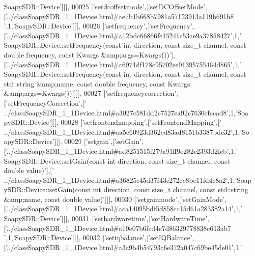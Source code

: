 \begin{DoxyCode}
{      SoapySDR::Device'}]]],
00025   [\textcolor{stringliteral}{'setdcoffsetmode'},[\textcolor{stringliteral}{'setDCOffsetMode'},[\textcolor{stringliteral}{'../classSoapySDR\_1\_1Device.html#ae7b1b668b7981a57123913a119b691b8
      '},1,\textcolor{stringliteral}{'SoapySDR::Device'}]]],
00026   [\textcolor{stringliteral}{'setfrequency'},[\textcolor{stringliteral}{'setFrequency'},[\textcolor{stringliteral}{'../classSoapySDR\_1\_1Device.html#a12bdc66866fe15241c53ae9a37858427'},1,\textcolor{stringliteral}{'
      SoapySDR::Device::setFrequency(const int direction, const size\_t channel, const double frequency, const
       Kwargs &amp;args=Kwargs())'}],[\textcolor{stringliteral}{'../classSoapySDR\_1\_1Device.html#a6971df178c95702ee91395755464d865'},1,\textcolor{stringliteral}{'
      SoapySDR::Device::setFrequency(const int direction, const size\_t channel, const std::string &amp;name, const double
       frequency, const Kwargs &amp;args=Kwargs())'}]]],
00027   [\textcolor{stringliteral}{'setfrequencycorrection'},[\textcolor{stringliteral}{'setFrequencyCorrection'},[\textcolor{stringliteral}{'
      ../classSoapySDR\_1\_1Device.html#a3027c581dd2c7527ca92c7630efccad8'},1,\textcolor{stringliteral}{'SoapySDR::Device'}]]],
00028   [\textcolor{stringliteral}{'setfrontendmapping'},[\textcolor{stringliteral}{'setFrontendMapping'},[\textcolor{stringliteral}{'
      ../classSoapySDR\_1\_1Device.html#aa5c60923d362ed83ad8151b3387bdc32'},1,\textcolor{stringliteral}{'SoapySDR::Device'}]]],
00029   [\textcolor{stringliteral}{'setgain'},[\textcolor{stringliteral}{'setGain'},[\textcolor{stringliteral}{'../classSoapySDR\_1\_1Device.html#ad8251515f279a91ff9e282e2393d2feb'},1,\textcolor{stringliteral}{'
      SoapySDR::Device::setGain(const int direction, const size\_t channel, const double value)'}],[\textcolor{stringliteral}{'
      ../classSoapySDR\_1\_1Device.html#a36825e45d37f43c272ec8be11fd4c8a2'},1,\textcolor{stringliteral}{'SoapySDR::Device::setGain(const int direction, const size\_t
       channel, const std::string &amp;name, const double value)'}]]],
00030   [\textcolor{stringliteral}{'setgainmode'},[\textcolor{stringliteral}{'setGainMode'},[\textcolor{stringliteral}{'../classSoapySDR\_1\_1Device.html#aca14095bdf5d858cc15d61a283382a14'},1,\textcolor{stringliteral}{'
      SoapySDR::Device'}]]],
00031   [\textcolor{stringliteral}{'sethardwaretime'},[\textcolor{stringliteral}{'setHardwareTime'},[\textcolor{stringliteral}{'../classSoapySDR\_1\_1Device.html#a19e07b6fcd4c7d86329778838c613ab7
      '},1,\textcolor{stringliteral}{'SoapySDR::Device'}]]],
00032   [\textcolor{stringliteral}{'setiqbalance'},[\textcolor{stringliteral}{'setIQBalance'},[\textcolor{stringliteral}{'../classSoapySDR\_1\_1Device.html#a3c9b4b54793c6e372a047c69be45de01'},1,\textcolor{stringliteral}{'
}
\end{DoxyCode}
